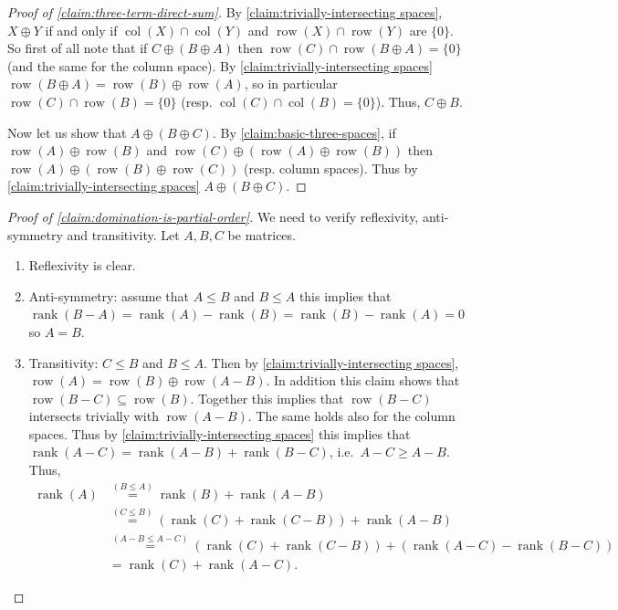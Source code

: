 \documentclass[10pt,a4paper]{article}
\newcommand{\prettyref}[1]{\cref{#1}}
\theoremstyle{definition}
\theoremstyle{remark}
\newcommand{\set}[1]{\{#1\}}
\DeclareMathOperator{\rank}{rank}
\DeclareMathOperator{\row}{row}
\DeclareMathOperator{\col}{col}
\renewcommand{\leq}{\leqslant}
\renewcommand{\geq}{\geqslant}
\numberwithin{equation}{section}
\let\pref=\prettyref
\begin{document}
\begin{proof}[Proof of \pref{claim:three-term-direct-sum}]
    
    By \pref{claim:trivially-intersecting spaces}, \(X \oplus Y\) if and only if \(\col(X) \cap \col(Y)\) and \(\row(X) \cap \row(Y)\) are \(\set{0}\). So first of all note that if \(C \oplus (B \oplus A)\) then \(\row(C) \cap \row(B \oplus A) = \set{0}\) (and the same for the column space). By \pref{claim:trivially-intersecting spaces} \(\row(B \oplus A) = \row(B) \oplus \row(A)\), so in particular \(\row(C) \cap \row(B) = \set{0}\) (resp. \(\col(C) \cap \col(B) = \set{0}\)). Thus, \(C \oplus B\).
    
    Now let us show that \(A \oplus (B \oplus C)\). By \pref{claim:basic-three-spaces}, if \(\row(A) \oplus \row(B)\) and \(\row(C) \oplus (\row(A) \oplus \row(B))\) then \(\row(A) \oplus (\row(B) \oplus \row(C))\) (resp. column spaces). Thus by \pref{claim:trivially-intersecting spaces} \(A \oplus (B \oplus C)\).
\end{proof}

\begin{proof}[Proof of \pref{claim:domination-is-partial-order}]
We need to verify reflexivity, anti-symmetry and transitivity. Let \(A,B,C\) be matrices.
    \begin{enumerate}
        \item Reflexivity is clear.
        \item Anti-symmetry: assume that \(A \leq B\) and \(B\leq A\) this implies that \(\rank(B-A) = \rank(A)-\rank(B) = \rank(B)-\rank(A)=0\) so \(A=B\).
        \item Transitivity: \(C \leq B\) and \(B \leq A\). Then by \pref{claim:trivially-intersecting spaces}, \(\row(A) = \row(B) \oplus \row(A-B)\). In addition this claim shows that \(\row(B-C) \subseteq \row(B)\). Together this implies that \(\row(B-C)\) intersects trivially with \(\row(A-B)\). The same holds also for the column spaces. Thus by \pref{claim:trivially-intersecting spaces} this implies that \(\rank(A-C) = \rank(A-B) + \rank(B-C)\), i.e.\ \(A-C \geq A-B\). Thus,
        \begin{align*}
          \rank(A) &\overset{(B\leq A)}{=} \rank(B) + \rank(A-B)  \\
          &\overset{(C\leq B)}{=} (\rank(C) + \rank(C-B)) + \rank(A-B) \\
          &\overset{(A-B\leq A-C)}{=} (\rank(C) + \rank(C-B)) + (\rank(A-C)-\rank(B-C)) \\
          &= \rank(C) + \rank(A-C).
        \end{align*}
    \end{enumerate}
\end{proof}
\end{document}
